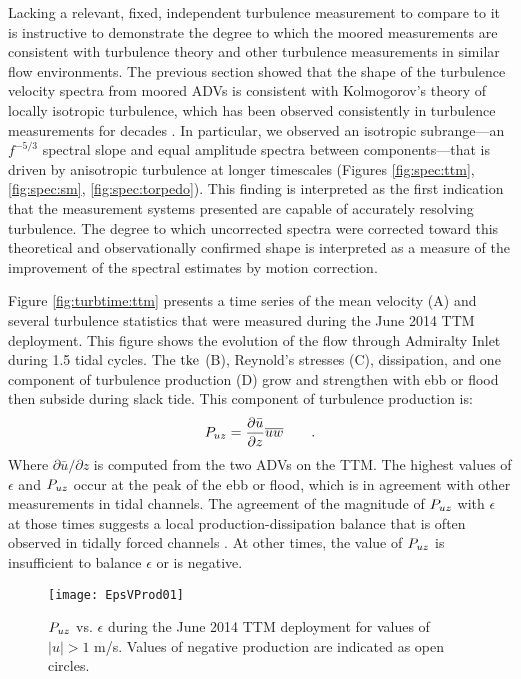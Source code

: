 Lacking a relevant, fixed, independent turbulence measurement to compare to it is instructive to demonstrate the degree to which the moored measurements are consistent with turbulence theory and other turbulence measurements in similar flow environments. The previous section showed that the shape of the turbulence velocity spectra from moored ADVs is consistent with Kolmogorov's theory of locally isotropic turbulence, which has been observed consistently in turbulence measurements for decades \cite[]{Kolmogorov1941c,Grant++1962,McMillan++2016}. In particular, we observed an isotropic subrange---an $f^{-5/3}$ spectral slope and equal amplitude spectra between components---that is driven by anisotropic turbulence at longer timescales (Figures \ref{fig:spec:ttm}, \ref{fig:spec:sm}, \ref{fig:spec:torpedo}). This finding is interpreted as the first indication that the measurement systems presented are capable of accurately resolving turbulence. The degree to which uncorrected spectra were corrected toward this theoretical and observationally confirmed shape is interpreted as a measure of the improvement of the spectral estimates by motion correction.

Figure \ref{fig:turbtime:ttm} presents a time series of the mean velocity (A) and several turbulence statistics that were measured during the June 2014 TTM deployment. This figure shows the evolution of the flow through Admiralty Inlet during 1.5 tidal cycles. The $\mathrm{tke}$ (B), Reynold's stresses (C), dissipation, and one component of turbulence production (D) grow and strengthen with ebb or flood then subside during slack tide.  This component of turbulence production is:
\begin{align}
  P_{uz} = \frac{\partial \bar{u}}{\partial z}\overline{uw} \qquad.
\end{align}
Where $\partial \bar{u}/\partial z$ is computed from the two ADVs on the TTM. The highest values of $\epsilon$ and $P_{uz}$ occur at the peak of the ebb or flood, which is in agreement with other measurements in tidal channels. The agreement of the magnitude of $P_{uz}$ with $\epsilon$ at those times suggests a local production-dissipation balance that is often observed in tidally forced channels \cite[]{Trowbridge++1999,Stacey++1999,McMillan++2016}. At other times, the value of $P_{uz}$ is insufficient to balance $\epsilon$ or is negative. 

\begin{figure}[t]
  \centering
  \texttt{[image: EpsVProd01]}
  \caption{$P_{uz}$ vs. $\epsilon$ during the June 2014 TTM deployment for values of $|u|>1$ m/s. Values of negative production are indicated as open circles. }
  \label{fig:prodVeps}
\end{figure}

